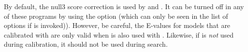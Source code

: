 \vspace{0.5in}


%

By default, the null3 score correction is used by  and . It can be turned off in any of these
programs by using the  option (which can only be seen
in the list of options if  is invoked)). However, be careful,
the E-values for models that are calibrated with  are
only valid when  is also used with
. Likewise, if  is \emph{not} used
during calibration, it should not be used during search.


